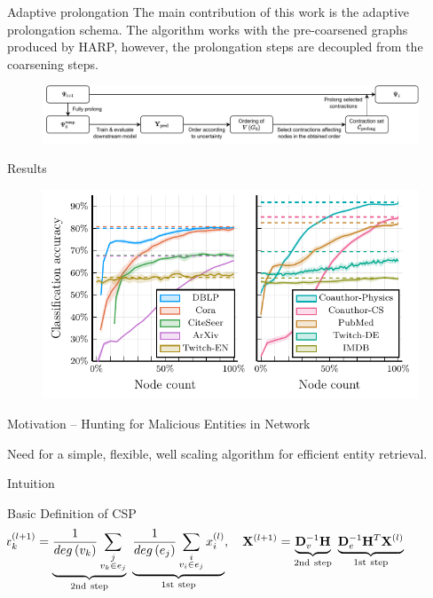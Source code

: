 \documentclass{beamer}
\newlength{\colwidth}
\newcommand{\mathmat}{\ensuremath{\mathbf}}
\newcommand{\uu}{v} %
\newcommand{\vv}{e} %
\newcommand{\HH}{\mathmat{H}} %
\newcommand{\D}{\mathmat{D}_v} %
\newcommand{\B}{\mathmat{D}_e} %
\begin{document}
\begin{frame}[fragile,t]
\begin{columns}[t]
\begin{column}{\colwidth}
		\begin{block}{Adaptive prolongation}
			The main contribution of this work is the adaptive prolongation schema. The algorithm works with the pre-coarsened graphs produced by HARP, however, the prolongation steps are decoupled from the coarsening steps.
			\begin{figure}
				\includegraphics[width=\linewidth]{images/adaptive-prolongation/adaptive-prolongation.pdf}
			\end{figure}
		\end{block}

		\begin{block}{Results}
			\begin{figure}
				\includegraphics[width = 0.95\linewidth]{images/adaptive-coarsening/adaptive-coarsening.pdf}
			\end{figure}
		\end{block}

		\begin{block}{Motivation -- Hunting for Malicious Entities in Network}
			

			Need for a simple, flexible, well scaling algorithm for efficient entity retrieval.
		\end{block}

		\begin{block}{Intuition}
			
		\end{block}

		\begin{block}{Basic Definition of CSP}
			\begin{equation*}
				\hspace*{-1.5cm}
				x_k^{(l+1)} = \underbrace{\frac{1}{deg\left( \uu_k \right)}\sum_{\substack{j \\ \uu_k \in \vv_j}}}_{\mathrm{2nd~step}} \ \underbrace{\frac{1}{deg \left( \vv_j \right)}\sum_{\substack{i \\ \uu_i \in \vv_j}} x_i^{(l)}}_{\mathrm{1st~step}}
				,\quad \mathmat{X}^{(l+1)} = \underbrace{\D^{-1} \HH}_{\mathrm{2nd~step}} \ \underbrace{\B^{-1} \HH^T \mathmat{X}^{(l)}}_{\mathrm{1st~step}}
			\end{equation*}


\end{block}
\end{column}
\end{columns}
\end{frame}
\end{document}
